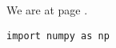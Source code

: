 \documentclass{article}
\begin{document}
We are at page \pageref{sec:here}.\label{sec:here}
\begin{lstlisting}
import numpy as np
\end{lstlisting}
\end{document}
